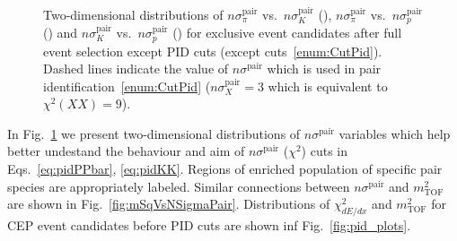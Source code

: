 \begin{figure}[h]
{  \begin{subfigure}[b]{\linewidth}\addtocounter{subfigure}{-2}\vspace*{-13pt}
  \end{subfigure}\\
  \begin{minipage}[t][1.042\linewidth][t]{\linewidth}\vspace{10pt}
    \caption[$n\sigma^{\text{pair}}_{X}$ vs. $n\sigma^{\text{pair}}_{Y}$.]{Two-dimensional distributions of $n\sigma^{\text{pair}}_{\pi}$ vs.~$n\sigma^{\text{pair}}_{K}$ (), $n\sigma^{\text{pair}}_{\pi}$ vs.~$n\sigma^{\text{pair}}_{p}$  () and $n\sigma^{\text{pair}}_{K}$ vs.~$n\sigma^{\text{pair}}_{p}$  () for exclusive event candidates after full event selection except PID cuts (except cuts~\ref{enum:CutPid}). Dashed lines indicate the value of $n\sigma^{\text{pair}}$ which is used in pair identification~\ref{enum:CutPid} ($n\sigma^{\text{pair}}_{X}=3$ which is equivalent to $\chi^{2}(XX)=9$).}\label{fig:SqRootNSigma2D}
  \end{minipage}
}%

\end{figure}


In Fig.~\ref{fig:SqRootNSigma2D} we present two-dimensional distributions of $n\sigma^{\text{pair}}$ variables which help better undestand the behaviour and aim of $n\sigma^{\text{pair}}$ ($\chi^{2}$) cuts in Eqs.~\eqref{eq:pidPPbar}, \eqref{eq:pidKK}. Regions of enriched population of specific pair species are appropriately labeled. Similar connections between $n\sigma^{\text{pair}}$ and $m^{2}_{\text{TOF}}$ are shown in Fig.~\ref{fig:mSqVsNSigmaPair}. Distributions of $\chi^{2}_{dE/dx}$ and $m^{2}_{\text{TOF}}$ for CEP event candidates before PID cuts are shown inf Fig.~\ref{fig:pid_plots}.
 

